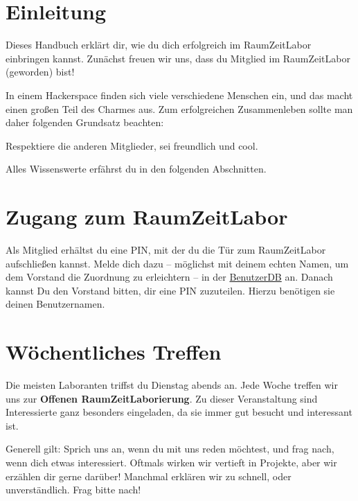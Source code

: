 \documentclass[12pt, DIV16, a4paper]{scrartcl}
\begin{document}
\pagestyle{fancy}
\newcommand{\np}{\bigskip\noindent}
\setlength{\parindent}{0pt}

\section*{Einleitung}

Dieses Handbuch erklärt dir, wie du dich erfolgreich im RaumZeitLabor
einbringen kannst. Zunächst freuen wir uns, dass du Mitglied im RaumZeitLabor
(geworden) bist!
\np

In einem Hackerspace finden sich viele verschiedene Menschen ein, und das macht
einen großen Teil des Charmes aus. Zum erfolgreichen Zusammenleben sollte man
daher folgenden Grundsatz beachten:

\begin{center}
	Respektiere die anderen Mitglieder, sei freundlich und cool.
\end{center}

Alles Wissenswerte erfährst du in den folgenden Abschnitten.

\section*{Zugang zum RaumZeitLabor}

Als Mitglied erhältst du eine PIN, mit der du die Tür zum RaumZeitLabor
aufschließen kannst. Melde dich dazu -- möglichst mit deinem echten Namen, um
dem Vorstand die Zuordnung zu erleichtern -- in der
\href{https://raumzeitlabor.de/BenutzerDB/register}{BenutzerDB} an. Danach
kannst Du den Vorstand bitten, dir eine PIN zuzuteilen. Hierzu benötigen sie
deinen Benutzernamen.

\section*{Wöchentliches Treffen}

Die meisten Laboranten triffst du Dienstag abends an. Jede Woche treffen wir
uns zur \textbf{Offenen RaumZeitLaborierung}. Zu dieser Veranstaltung sind
Interessierte ganz besonders eingeladen, da sie immer gut besucht und
interessant ist.
\np

Generell gilt: Sprich uns an, wenn du mit uns reden möchtest, und frag nach,
wenn dich etwas interessiert. Oftmals wirken wir vertieft in Projekte, aber wir
erzählen dir gerne darüber! Manchmal erklären wir zu schnell, oder
unverständlich. Frag bitte nach!
\end{document}
